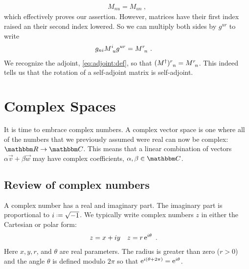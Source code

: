 \documentclass[12pt, oneside]{report}    %
\let\oldsection\section
\def\section{%
  \setcounter{sidenote}{1}%
  \oldsection
}
\begin{document}
\begin{subappendices}
\begin{align}
    M_{nu} = M_{un} \ ,
\end{align}
which effectively proves our assertion. However, matrices have their first index raised an their second index lowered. So we can multiply both sides by $g^{ur}$ to write
\begin{align}
    g_{ni}M\aij{i}{u}g^{ur} &= M\aij{r}{n} \ .
\end{align}
We recognize the adjoint, \eqref{eq:adjoint:def}, so that $(M^\dag)\aij{r}{n} = M\aij{r}{n}$. This indeed tells us that the rotation of a self-adjoint matrix is self-adjoint. 

\end{subappendices}



\chapter{Complex Spaces}




It is time to embrace complex numbers. A complex vector space is one where all of the numbers that we previously assumed were real can now be complex: $\RR \to \CC$. This means that a linear combination of vectors $\alpha\vec{v}+ \beta\vec{w}$ may have complex coefficients, $\alpha,\beta\in\CC$. 

\section{Review of complex numbers}

A complex number has a real and imaginary part. The imaginary part is proportional to  $i \defeq \sqrt{-1}$. We typically write complex numbers $z$ in either the Cartesian or polar form:
\begin{align}
    z &= x+iy 
    &
    z &= r \operatorname{e}^{i\theta}
    \ .
\end{align}
Here $x,y,r$, and $\theta$ are real parameters. The radius is greater than zero ($r>0$) and the angle $\theta$ is defined modulo $2\pi$ so that $\operatorname{e}^{i(\theta+2\pi)} = \operatorname{e}^{i\theta}$.
\end{document}
